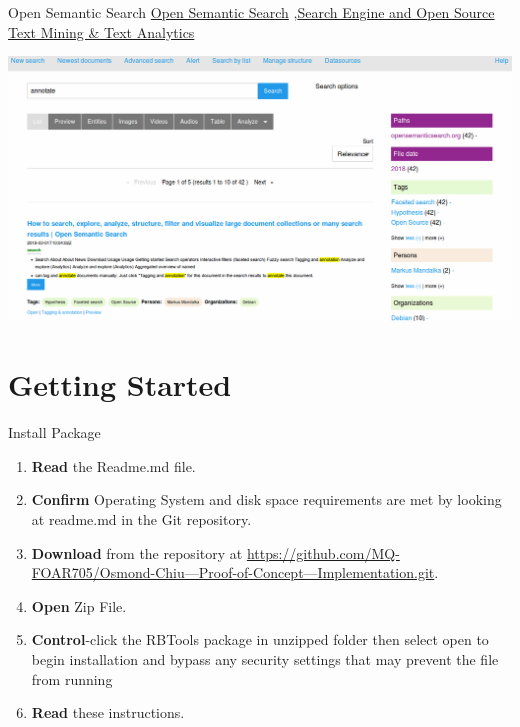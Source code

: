 \documentclass[10pt,a4paper]{article}
\begin{document}
\begin{textbox}{Open Semantic Search}
\href{https://www.opensemanticsearch.org}{Open Semantic Search} \sep \href{https://www.opensemanticsearch.org}{Search Engine and Open Source Text Mining & Text Analytics}

\includegraphics[width=\textwidth]{search.png}

\end{textbox}



\section{Getting Started}



\begin{textbox}{Install Package}
 

  

\begin{enumerate}
\item \textbf{Read} the Readme.md file.
\item \textbf{Confirm} Operating System and disk space requirements are met by looking at readme.md in the Git repository.
\item \textbf{Download} from the repository at \href{https://github.com/MQ-FOAR705/Osmond-Chiu---Proof-of-Concept---Implementation.git}{https://github.com/MQ-FOAR705/Osmond-Chiu---Proof-of-Concept---Implementation.git}.
\item \textbf{Open} Zip File.
\item \textbf{Control}-click the RBTools package in unzipped folder then select open to begin installation and bypass any security settings that may prevent the file from running
\item \textbf{Read} these instructions.
\end{enumerate}

\end{textbox}
\end{document}
